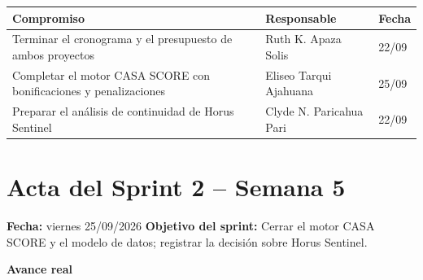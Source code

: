 \documentclass[11pt,a4paper]{article}
\begin{document}
\vspace{0.05cm}
{\footnotesize
{}
\noindent\begin{tabularx}{\textwidth}{@{}L P{3.6cm} C{1.6cm}@{}}
\toprule
{}
\textbf{Compromiso} & \textbf{Responsable} & \textbf{Fecha} \\
\midrule
Terminar el cronograma y el presupuesto de ambos proyectos & Ruth K. Apaza Solis & 22/09 \\
Completar el motor CASA SCORE con bonificaciones y penalizaciones & Eliseo Tarqui Ajahuana & 25/09 \\
Preparar el análisis de continuidad de Horus Sentinel & Clyde N. Paricahua Pari & 22/09 \\
\bottomrule
\end{tabularx}
}

\section{Acta del Sprint 2 -- Semana 5}
\noindent\textbf{Fecha:} viernes 25/09/2026 \quad \textbar\quad \textbf{Objetivo del sprint:} Cerrar el motor CASA SCORE y el modelo de datos; registrar la decisión sobre Horus Sentinel.

\vspace{0.1cm}
\noindent\textbf{Avance real}
\end{document}
